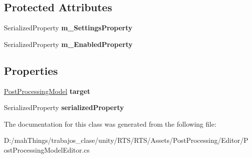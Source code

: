 \subsection*{Protected Attributes}
\begin{DoxyCompactItemize}
\item 
\mbox{\label{class_unity_editor_1_1_post_processing_1_1_post_processing_model_editor_a4c15114294b905462f55c9cca5a9fae3}} 
Serialized\+Property {\bfseries m\+\_\+\+Settings\+Property}
\item 
\mbox{\label{class_unity_editor_1_1_post_processing_1_1_post_processing_model_editor_a1cb2826825c2c94ba93b07c74bacb36d}} 
Serialized\+Property {\bfseries m\+\_\+\+Enabled\+Property}
\end{DoxyCompactItemize}
\subsection*{Properties}
\begin{DoxyCompactItemize}
\item 
\mbox{\label{class_unity_editor_1_1_post_processing_1_1_post_processing_model_editor_a53c7a213e12f6be0712a6cb752bf61ec}} 
\mbox{\hyperlink{class_unity_engine_1_1_post_processing_1_1_post_processing_model}{Post\+Processing\+Model}} {\bfseries target}
\item 
\mbox{\label{class_unity_editor_1_1_post_processing_1_1_post_processing_model_editor_a64e8869152a0ca85df60e69ba1033e16}} 
Serialized\+Property {\bfseries serialized\+Property}
\end{DoxyCompactItemize}


The documentation for this class was generated from the following file\+:\begin{DoxyCompactItemize}
\item 
D\+:/mah\+Things/trabajos\+\_\+clase/unity/\+R\+T\+S/\+R\+T\+S/\+Assets/\+Post\+Processing/\+Editor/Post\+Processing\+Model\+Editor.\+cs\end{DoxyCompactItemize}
